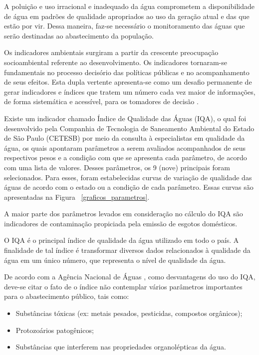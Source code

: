A poluição e uso irracional e inadequado da água comprometem a disponibilidade de água em padrões de qualidade apropriados 
ao uso da geração atual e das que estão por vir. Dessa maneira, faz-se necessário o monitoramento das águas que serão
destinadas ao abastecimento da população.

Os indicadores ambientais surgiram a partir da crescente preocupação socioambiental referente ao desenvolvimento.
Os indicadores tornaram-se fundamentais no processo decisório das políticas públicas e no acompanhamento de seus efeitos.
Esta dupla vertente apresenta-se como um desafio permanente de gerar indicadores e índices que tratem um número cada vez 
maior de informações, de forma sistemática e acessível, para os tomadores de decisão \cite{cetesbIndiceQualidadeH2O}.

Existe um indicador chamado Índice de Qualidade das Águas (IQA), o qual foi desenvolvido pela 
Companhia de Tecnologia de Saneamento Ambiental do Estado de São Paulo (CETESB) por meio da consulta à especialistas 
em qualidade da água, os quais apontaram parâmetros a serem avaliados acompanhados de seus respectivos pesos e a 
condição com que se apresenta cada parâmetro, de acordo com uma lista de valores. Desses parâmetros, os 9 (nove) 
principais foram selecionados. Para esses, foram estabelecidas curvas de variação de qualidade das águas de acordo 
com o estado ou a condição de cada parâmetro. Essas curvas são apresentadas na Figura ~\ref{graficos_parametros}.

A maior parte dos parâmetros levados em consideração no cálculo do IQA são indicadores de contaminação propiciada
pela emissão de esgotos domésticos.

O IQA é o principal índice de qualidade da água utilizado em todo o país. A finalidade de tal índice é transformar 
diversos dados relacionados à qualidade da água em um único número, que representa o nível de qualidade da água.

De acordo com a Agência Nacional de Águas \cite{anaGovIndicadores}, como desvantagens do uso do IQA, deve-se citar o fato de
o índice não contemplar vários parâmetros importantes para o abastecimento público, tais como:

\begin{itemize}
 \item Substâncias tóxicas (ex: metais pesados, pesticidas, compostos orgânicos);
 \item Protozoários patogênicos;
 \item Substâncias que interferem nas propriedades organolépticas da água.
\end{itemize}

